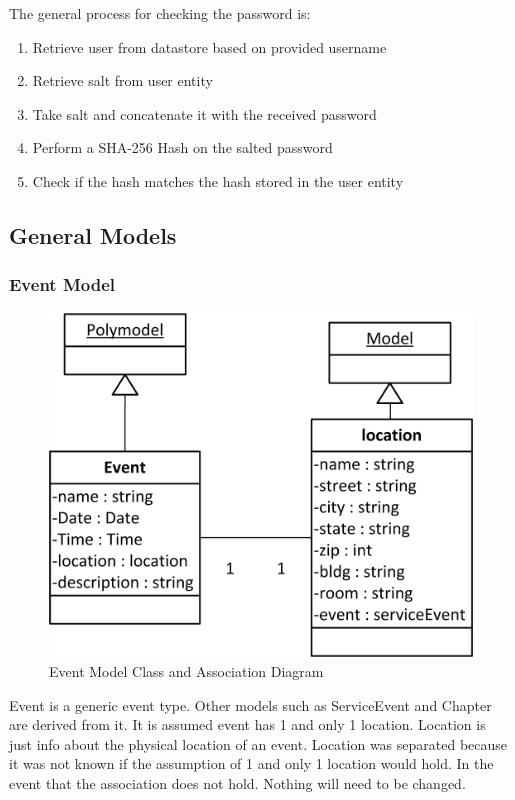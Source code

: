\documentclass{article}
\begin{document}
The general process for checking the password is:

\begin{enumerate}
\item Retrieve user from datastore based on provided username
\item Retrieve salt from user entity
\item Take salt and concatenate it with the received password
\item Perform a SHA-256 Hash on the salted password
\item Check if the hash matches the hash stored in the user entity
\end{enumerate}

\subsection{General Models}

\subsubsection{Event Model}

\FloatBarrier
\begin{figure}[h!]
\centering
\includegraphics[scale=.65]{img/modelDiagrams/eventModel}
\caption{Event Model Class and Association Diagram}
\label{fig:eventModelDiagram}
\end{figure}
\FloatBarrier

Event is a generic event type. Other models such as ServiceEvent and Chapter are derived from it. It is assumed event has 1 and only 1 location. Location is just info about the physical location of an event. Location was separated because it was not known if the assumption of 1 and only 1 location would hold. In the event that the association does not hold. Nothing will need to be changed.
\end{document}
